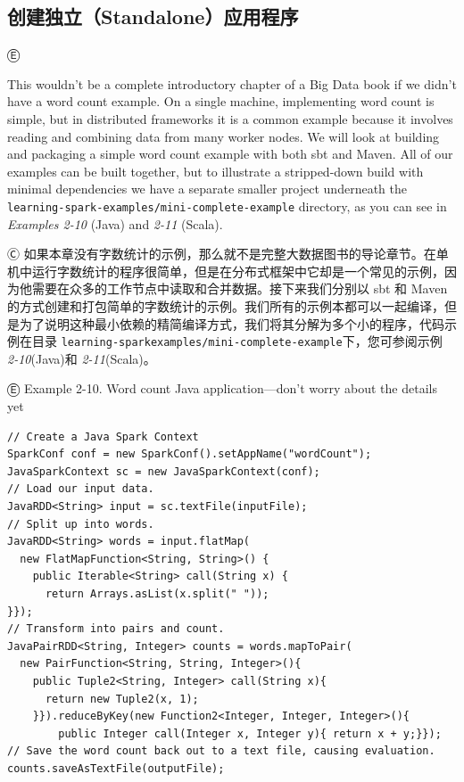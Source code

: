 {\subsection{创建独立（Standalone）应用程序}\label{ux521bux5efaux72ecux7acbstandaloneux5e94ux7528ux7a0bux5e8f}

Ⓔ \textcolor{etc}{This wouldn't be a complete introductory chapter of a Big Data book if we didn't have a word count example. On a single machine, implementing word count is simple, but in distributed frameworks it is a common example because it involves reading and combining data from many worker nodes. We will look at building and packaging a simple word count example with both sbt and Maven. All of our examples can be built together, but to illustrate a stripped-down build with minimal dependencies we have a separate smaller project underneath the \lstinline{learning-spark-examples/mini-complete-example} directory, as you can see in \emph{Examples 2-10} (Java) and \emph{2-11} (Scala).

Ⓒ
如果本章没有字数统计的示例，那么就不是完整大数据图书的导论章节。在单机中运行字数统计的程序很简单，但是在分布式框架中它却是一个常见的示例，因为他需要在众多的工作节点中读取和合并数据。接下来我们分别以 sbt 和 Maven
的方式创建和打包简单的字数统计的示例。我们所有的示例本都可以一起编译，但是为了说明这种最小依赖的精简编译方式，我们将其分解为多个小的程序，代码示例在目录
\lstinline{learning-sparkexamples/mini-complete-example}下，您可参阅示例
\emph{2-10}(Java)和 \emph{2-11}(Scala)。

Ⓔ Example 2-10. Word count Java application---don't worry about the
details yet

\begin{lstlisting}
// Create a Java Spark Context
SparkConf conf = new SparkConf().setAppName("wordCount");
JavaSparkContext sc = new JavaSparkContext(conf);
// Load our input data.
JavaRDD<String> input = sc.textFile(inputFile);
// Split up into words.
JavaRDD<String> words = input.flatMap(
  new FlatMapFunction<String, String>() {
    public Iterable<String> call(String x) {
      return Arrays.asList(x.split(" "));
}});
// Transform into pairs and count.
JavaPairRDD<String, Integer> counts = words.mapToPair(
  new PairFunction<String, String, Integer>(){
    public Tuple2<String, Integer> call(String x){
      return new Tuple2(x, 1);
    }}).reduceByKey(new Function2<Integer, Integer, Integer>(){
        public Integer call(Integer x, Integer y){ return x + y;}});
// Save the word count back out to a text file, causing evaluation.
counts.saveAsTextFile(outputFile);
\end{lstlisting}

}}
